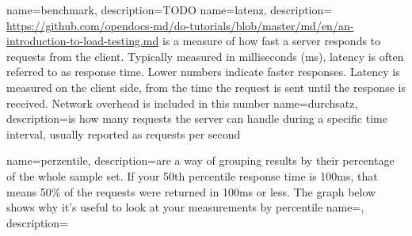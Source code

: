 {
    name=benchmark,
    description={TODO}
}
{
    name=latenz,
    description={
            \url{https://github.com/opendocs-md/do-tutorials/blob/master/md/en/an-introduction-to-load-testing.md}
            is a measure of how fast a server responds to requests from the client.
            Typically measured in milliseconds (ms), latency is often referred to as response time.
            Lower numbers indicate faster responses. Latency is measured on the client side, from the
            time the request is sent until the response is received. Network overhead is included in this number}
}
{
    name=durchsatz,
    description={is how many requests the server can handle during a specific time interval, usually reported as requests per second}
}

{
    name=perzentile,
    description={are a way of grouping results by their percentage of the whole sample set.
            If your 50th percentile response time is 100ms, that means
            50\% of the requests were returned in 100ms or less. The graph below shows why it’s useful to look at your measurements by percentile}
}
{
    name=,
    description={}
}

